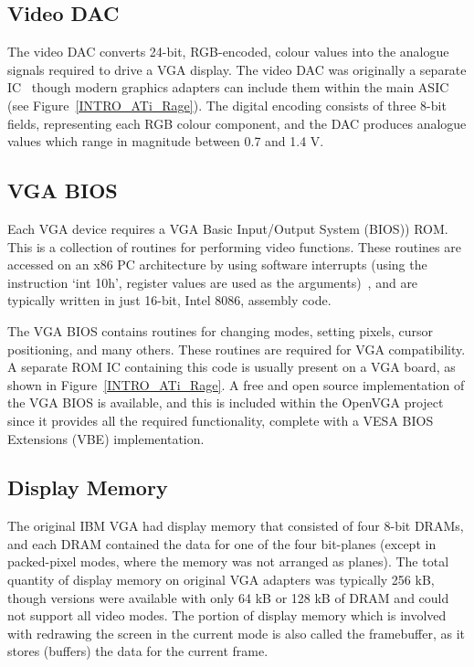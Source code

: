 \subsection{Video DAC}
The video DAC converts 24-bit, RGB-encoded, colour values into the analogue
signals required to drive a VGA display. The video DAC was originally a
separate IC~\cite{VGA_Programmers, SVGA_Book} though modern graphics adapters
can include them within the main ASIC (see Figure~\ref{INTRO_ATi_Rage}). The
digital encoding consists of three 8-bit fields, representing each RGB colour
component, and the DAC produces analogue values which range in magnitude between
0.7 and 1.4 V.


\subsection{VGA BIOS}
Each VGA device requires a VGA Basic Input/Output System (BIOS)) ROM. This is a collection of
routines for performing video functions. These routines are accessed on an x86 PC
architecture by using software interrupts (using the instruction `int 10h',
register values are used as the arguments)~\cite{VGA_Programmers, SVGA_Book}, and
are typically written in just 16-bit, Intel 8086, assembly code.

The VGA BIOS contains routines for changing modes, setting pixels, cursor
positioning, and many others. These routines are required for VGA compatibility.
A separate ROM IC containing this code is usually present on a VGA board, as
shown in Figure~\ref{INTRO_ATi_Rage}. A free and open source implementation of
the VGA BIOS is available, and this is included within the OpenVGA project since
it provides all the required functionality, complete with a VESA BIOS Extensions
(VBE) implementation.


\subsection{Display Memory}
\label{VGA_Display_Memory}
The original IBM VGA had display memory that consisted of four 8-bit DRAMs, and
each DRAM contained the data for one of the four bit-planes (except in
packed-pixel modes, where the memory was not arranged as planes). The total
quantity of display memory on original VGA adapters was typically 256 kB, though
versions were available with only 64 kB or 128 kB of DRAM and could not support
all video modes. The portion of display memory which is involved with redrawing
the screen in the current mode is also called the framebuffer, as it stores
(buffers) the data for the current frame.

